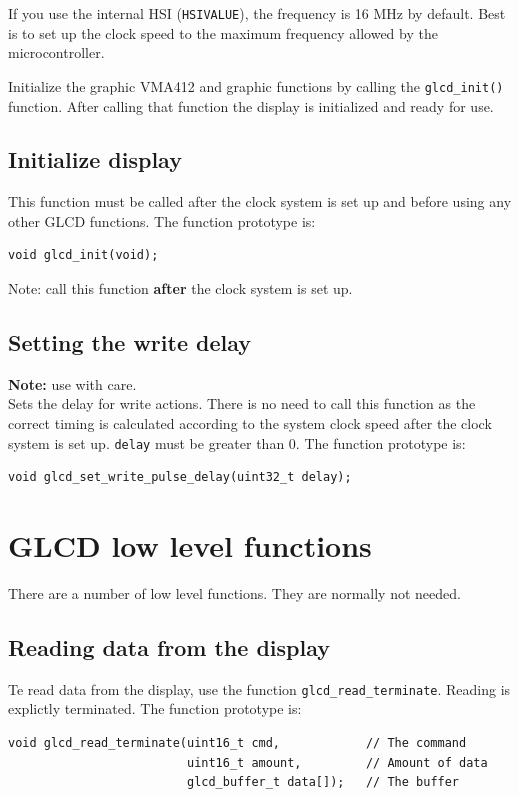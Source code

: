 \documentclass[12pt]{article}
\begin{document}
If you use the internal HSI (\lstinline|HSIVALUE|), the frequency is 16 MHz by default. Best is to set up the clock speed to the maximum frequency allowed by the microcontroller.

Initialize the graphic VMA412 and graphic functions by calling the \lstinline|glcd_init()| function. After calling that function the display is initialized and ready for use.

\subsection{Initialize display}
This function must be called after the clock system is set up and before using any other GLCD functions. The function prototype is:
\begin{lstlisting}
void glcd_init(void);
\end{lstlisting}

Note: call this function \textbf{after} the clock system is set up.

\subsection{Setting the write delay}
\textbf{Note:} use with care.\\
Sets the delay for write actions. There is no need to call this function as the correct timing is calculated according to the system clock speed after the clock system is set up. \lstinline|delay| must be greater than 0. The function prototype is:
\begin{lstlisting}
void glcd_set_write_pulse_delay(uint32_t delay);
\end{lstlisting}


\section{GLCD low level functions}
There are a number of low level functions. They are normally not needed.

\subsection{Reading data from the display}
Te read data from the display, use the function \lstinline|glcd_read_terminate|. Reading is explictly terminated. The function prototype is:

\begin{lstlisting}
void glcd_read_terminate(uint16_t cmd,            // The command
                         uint16_t amount,         // Amount of data
                         glcd_buffer_t data[]);   // The buffer
\end{lstlisting}
\end{document}
